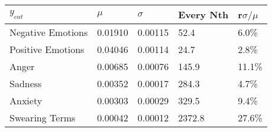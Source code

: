 \begin{tabular}{lllll}
\toprule
$y_{cat}$ &    $\mu$ & $\sigma$ & Every Nth & r$\sigma / \mu$ \\
\midrule
Negative Emotions &  0.01910 &  0.00115 &      52.4 &           6.0\% \\
Positive Emotions &  0.04046 &  0.00114 &      24.7 &           2.8\% \\
Anger             &  0.00685 &  0.00076 &     145.9 &          11.1\% \\
Sadness           &  0.00352 &  0.00017 &     284.3 &           4.7\% \\
Anxiety           &  0.00303 &  0.00029 &     329.5 &           9.4\% \\
Swearing Terms    &  0.00042 &  0.00012 &    2372.8 &          27.6\% \\
\bottomrule
\end{tabular}
